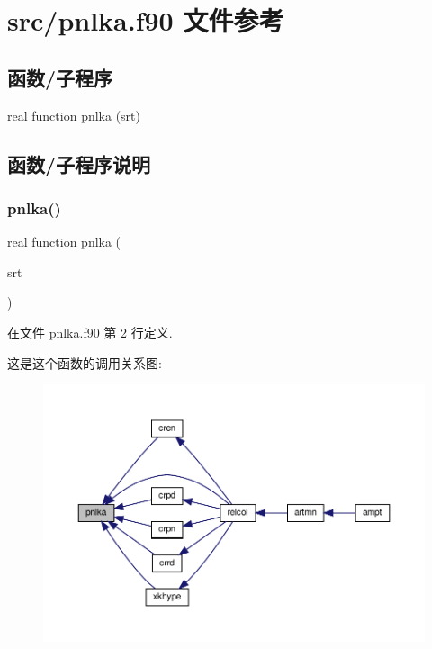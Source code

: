 \hypertarget{pnlka_8f90}{}\section{src/pnlka.f90 文件参考}
\label{pnlka_8f90}
\subsection*{函数/子程序}
\begin{DoxyCompactItemize}
\item 
real function \mbox{\hyperlink{pnlka_8f90_af1123254edd22f762618935277600ff6}{pnlka}} (srt)
\end{DoxyCompactItemize}


\subsection{函数/子程序说明}
\mbox{\label{pnlka_8f90_af1123254edd22f762618935277600ff6}} 
\subsubsection{\texorpdfstring{pnlka()}{pnlka()}}
{\footnotesize\ttfamily real function pnlka (\begin{DoxyParamCaption}\item[{}]{srt }\end{DoxyParamCaption})}



在文件 pnlka.\+f90 第 2 行定义.

这是这个函数的调用关系图\+:
\nopagebreak
\begin{figure}[H]
\begin{center}
\leavevmode
\includegraphics[width=350pt]{pnlka_8f90_af1123254edd22f762618935277600ff6_icgraph}
\end{center}
\end{figure}
